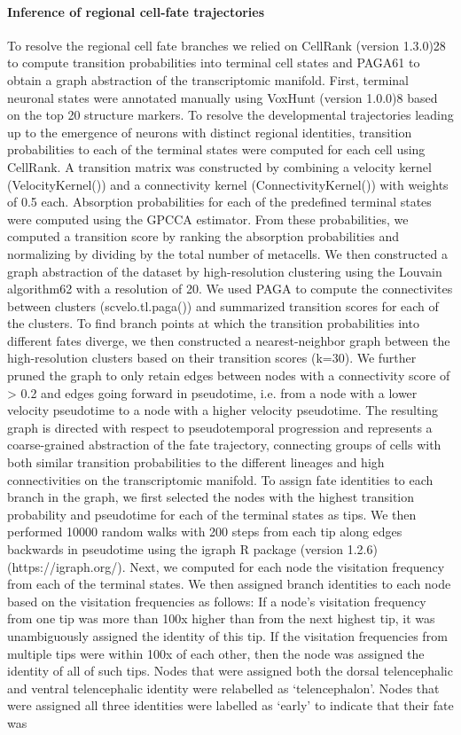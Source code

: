 \paragraph{Inference of regional cell-fate trajectories}
To resolve the regional cell fate branches we relied on CellRank (version 1.3.0)28 to compute transition probabilities into terminal cell states and PAGA61 to obtain a graph abstraction of the transcriptomic manifold. First, terminal neuronal states were annotated manually using VoxHunt (version 1.0.0)8 based on the top 20 structure markers. To resolve the developmental trajectories leading up to the emergence of neurons with distinct regional identities, transition probabilities to each of the terminal states were computed for each cell using CellRank. A transition matrix was constructed by combining a velocity kernel (VelocityKernel()) and a connectivity kernel (ConnectivityKernel()) with weights of 0.5 each. Absorption probabilities for each of the predefined terminal states were computed using the GPCCA estimator. From these probabilities, we computed a transition score by ranking the absorption probabilities and normalizing by dividing by the total number of metacells. We then constructed a graph abstraction of the dataset by high-resolution clustering using the Louvain algorithm62 with a resolution of 20. We used PAGA to compute the connectivites between clusters (scvelo.tl.paga()) and summarized transition scores for each of the clusters. To find branch points at which the transition probabilities into different fates diverge, we then constructed a nearest-neighbor graph between the high-resolution clusters based on their transition scores (k=30). We further pruned the graph to only retain edges between nodes with a connectivity score of > 0.2 and edges going forward in pseudotime, i.e. from a node with a lower velocity pseudotime to a node with a higher velocity pseudotime. The resulting graph is directed with respect to pseudotemporal progression and represents a coarse-grained abstraction of the fate trajectory, connecting groups of cells with both similar transition probabilities to the different lineages and high connectivities on the transcriptomic manifold. To assign fate identities to each branch in the graph, we first selected the nodes with the highest transition probability and pseudotime for each of the terminal states as tips. We then performed 10000 random walks with 200 steps from each tip along edges backwards in pseudotime using the igraph R package (version 1.2.6) (https://igraph.org/). Next, we computed for each node the visitation frequency from each of the terminal states. We then assigned branch identities to each node based on the visitation frequencies as follows: If a node's visitation frequency from one tip was more than 100x higher than from the next highest tip, it was unambiguously assigned the identity of this tip. If the visitation frequencies from multiple tips were within 100x of each other, then the node was assigned the identity of all of such tips. Nodes that were assigned both the dorsal telencephalic and ventral telencephalic identity were relabelled as ‘telencephalon’. Nodes that were assigned all three identities were labelled as ‘early’ to indicate that their fate was 